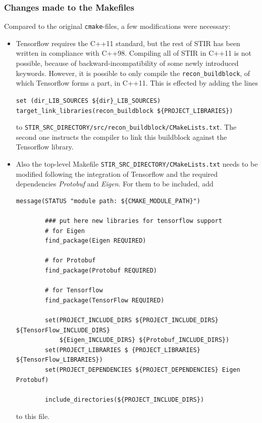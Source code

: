 \documentclass[a4paper, 11pt]{article}
\begin{document}
   \subsubsection{Changes made to the Makefiles}
   Compared to the original \texttt{cmake}-files, a few modifications were necessary:
   \begin{itemize}
   \item Tensorflow requires the C++11 standard, but the rest of STIR has been written in compliance with C++98. Compiling all of STIR in C++11 is not possible, because of backward-incompatibility of some newly introduced keywords. However, it is possible to only compile the \texttt{recon\_buildblock}, of which Tensorflow forms a part, in C++11. This is effected by adding the lines

      \texttt{set (dir\_LIB\_SOURCES \$\{dir\}\_LIB\_SOURCES)\\
      target\_link\_libraries(recon\_buildblock \$\{PROJECT\_LIBRARIES\})}

      to \texttt{STIR\_SRC\_DIRECTORY/src/recon\_buildblock/CMakeLists.txt}. The second one instructs the compiler to link this buildblock against the Tensorflow library.
    \item Also the top-level Makefile \texttt{STIR\_SRC\_DIRECTORY/CMakeLists.txt} needs to be modified following the integration of Tensorflow and the required dependencies \textsl{Protobuf} and \textsl{Eigen}. For them to be included, add
      
      \begin{lstlisting}[basicstyle=\small]
        message(STATUS "module path: ${CMAKE_MODULE_PATH}")
        
        ### put here new libraries for tensorflow support
        # for Eigen
        find_package(Eigen REQUIRED)
        
        # for Protobuf
        find_package(Protobuf REQUIRED)
        
        # for Tensorflow
        find_package(TensorFlow REQUIRED)
        
        set(PROJECT_INCLUDE_DIRS ${PROJECT_INCLUDE_DIRS} ${TensorFlow_INCLUDE_DIRS} 
            ${Eigen_INCLUDE_DIRS} ${Protobuf_INCLUDE_DIRS})
        set(PROJECT_LIBRARIES $ {PROJECT_LIBRARIES} ${TensorFlow_LIBRARIES})
        set(PROJECT_DEPENDENCIES ${PROJECT_DEPENDENCIES} Eigen Protobuf)
        
        include_directories(${PROJECT_INCLUDE_DIRS})
      \end{lstlisting}
      
      to this file.
  \end{itemize}
\end{document}
